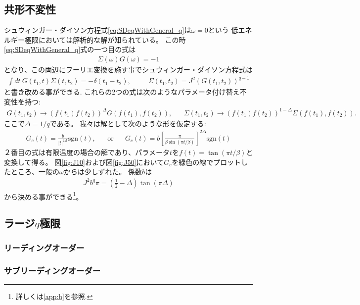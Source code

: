 \subsection{共形不変性}
シュウィンガー・ダイソン方程式\eqref{eq:SDeqWithGeneral_q}は$\omega = 0$という
低エネルギー極限においては解析的な解が知られている。
この時\eqref{eq:SDeqWithGeneral_q}式の一つ目の式は
\begin{align}
	\Sigma(\omega)G(\omega) = -1
\end{align}
となり、この両辺にフーリエ変換を施す事でシュウィンガー・ダイソン方程式は
\begin{align}
	\int dt\ G(t_1, t)\Sigma(t, t_2) = -\delta(t_1 - t_2),
	\hspace{30pt}
	\Sigma(t_1, t_2) = J^2 (G(t_1, t_2))^{q-1}
	\label{eq:conformalSD}
\end{align}
と書き改める事ができる.
これらの2つの式は次のようなパラメータ付け替え不変性を持つ:
\begin{align}
	G(t_1, t_2) \to (f(t_1)f(t_2))^{\Delta}G(f(t_1),f(t_2)),
	\hspace{20pt}
	\Sigma(t_1, t_2) \to (f(t_1)f(t_2))^{1 - \Delta}\Sigma(f(t_1),f(t_2)).
\end{align}
ここで$\Delta = 1 / q$である。
我々は解として次のような形を仮定する:
\begin{align}
	G_c(t) = \frac{b}{|t|^{2\Delta}}\mathrm{sgn}(t),
	\hspace{20pt}
	\mathrm{or}
	\hspace{20pt}
	G_c(t) = b\left[\frac{\pi}{\beta\sin(\pi t / \beta)}\right]^{2\Delta}\mathrm{sgn}(t)
	\label{eq:conformal_ansatz}
\end{align}
２番目の式は有限温度の場合の解であり、パラメータ$t$を$f(t) = \tan(\pi t / \beta)$と変換して得る。
図\ref{fig:J10}および図\ref{fig:J50}において$G_c$を緑色の線でプロットしたところ、一般の$\omega$からは少しずれた。
係数$b$は
\begin{align}
	J^2 b^q \pi = \left(\frac{1}{2} - \Delta \right)\tan(\pi \Delta)
\end{align}
から決める事ができる\footnote{詳しくは\ref{app:b}を参照.}。

\subsection{ラージ$q$極限}

\subsubsection{リーディングオーダー}

\subsubsection{サブリーディングオーダー}





\pagebreak
